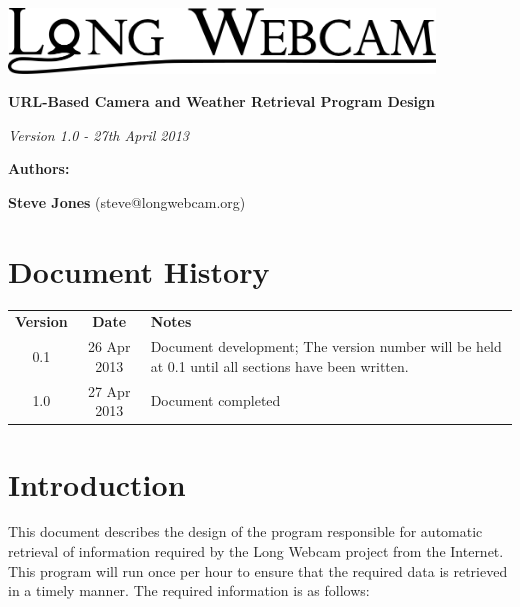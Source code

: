 \documentclass[11pt]{article}
\begin{document}
\begin{titlepage}
\begin{center}

\includegraphics[width=0.85\textwidth]{./Logo_Large-cropped_black.png}

\vspace{3 cm}

\textbf{\Huge{URL-Based Camera and Weather Retrieval Program Design}}

\vspace{1 cm}

\textit{\large{Version 1.0 - 27th April 2013}}

\vspace{4 cm}

\textbf{\Large{Authors:}}

\textbf{Steve Jones} (steve@longwebcam.org)

\end{center}

\end{titlepage}

\setcounter{tocdepth}{2}
\tableofcontents
\clearpage
{}
\section*{Document History}
\begin{table}[tbhp!]
\begin{tabular}{ c c p{4in} }
\textbf{Version} & \textbf{Date} & \textbf{Notes} \\
0.1 & 26 Apr 2013 & Document development; The version number will be held at 0.1 until all sections have been written. \\
1.0 & 27 Apr 2013 & Document completed
\end{tabular}
\end{table}

\clearpage
{}

\section{Introduction}
This document describes the design of the program responsible for automatic retrieval of information required by the Long Webcam project from the Internet. This program will run once per hour to ensure that the required data is retrieved in a timely manner. The required information is as follows: 
\end{document}
